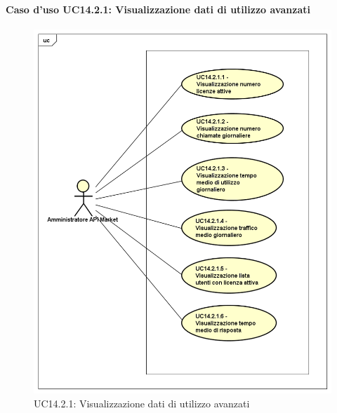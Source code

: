 \paragraph{Caso d'uso UC14.2.1: Visualizzazione dati di utilizzo avanzati}
\label{UC14_2_1}
\begin{figure}[ht]
	\centering
	\includegraphics[scale=0.45]{UML/UC14_2_1.png}
	\caption{UC14.2.1: Visualizzazione dati di utilizzo avanzati}
\end{figure}

